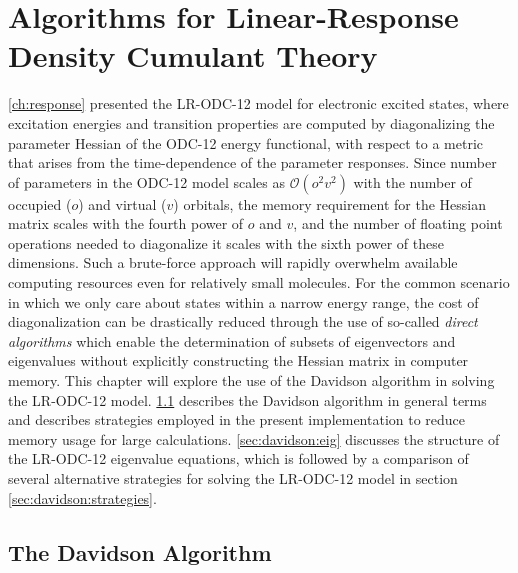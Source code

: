 \chapter[%
    Algorithms for Linear-Response Density Cumulant Theory
]{%
    Algorithms for Linear-Response Density Cumulant Theory
}
\label{ch:davidson}

\cref{ch:response} presented the LR-ODC-12 model for electronic excited states,
where excitation energies and transition properties are computed by
diagonalizing the parameter Hessian of the ODC-12 energy functional, with
respect to a metric that arises from the time-dependence of the parameter
responses.
Since number of parameters in the ODC-12 model scales as
\(
    \mathcal{O}(o^2v^2)
\)
with the number of occupied (\(o\)) and virtual (\(v\)) orbitals, the
memory requirement for the Hessian matrix scales with the fourth power
of \(o\) and \(v\), and the number of floating point operations needed
to diagonalize it scales with the sixth power of these dimensions.
Such a brute-force approach will rapidly overwhelm available computing
resources even for relatively small molecules.
For the common scenario in which we only care about states within a narrow
energy range, the cost of diagonalization can be drastically reduced through the
use of so-called {\itshape direct algorithms} which enable the determination of
subsets of eigenvectors and eigenvalues without explicitly constructing the
Hessian matrix in computer memory.
This chapter will explore the use of the Davidson
algorithm\cite{Liu:1978p49,Davidson:1975p87} in solving the LR-ODC-12 model.
\cref{sec:davidson:davidson} describes the Davidson algorithm in general terms
and describes strategies employed in the present implementation to reduce memory
usage for large calculations.
\cref{sec:davidson:eig} discusses the structure of the LR-ODC-12 eigenvalue
equations, which is followed by a comparison of several alternative strategies
for solving the LR-ODC-12 model in section \cref{sec:davidson:strategies}.


\section{The Davidson Algorithm}
\label{sec:davidson:davidson}

